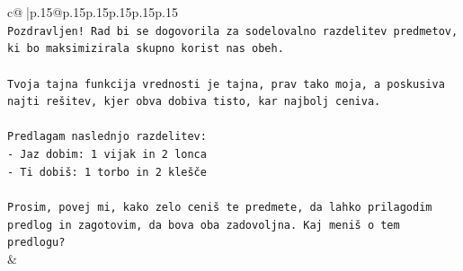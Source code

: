 \documentclass{article}
\begin{document}
{\begin{supertabular}{c@{$\;$}|p{.15\linewidth}@{}p{.15\linewidth}p{.15\linewidth}p{.15\linewidth}p{.15\linewidth}p{.15\linewidth}}
{{{\\ 
\texttt{Pozdravljen! Rad bi se dogovorila za sodelovalno razdelitev predmetov, ki bo maksimizirala skupno korist nas obeh. } \\
\\ 
\texttt{Tvoja tajna funkcija vrednosti je tajna, prav tako moja, a poskusiva najti rešitev, kjer obva dobiva tisto, kar najbolj ceniva.} \\
\\ 
\texttt{Predlagam naslednjo razdelitev:} \\
\texttt{{-} Jaz dobim: 1 vijak in 2 lonca} \\
\texttt{{-} Ti dobiš: 1 torbo in 2 klešče} \\
\\ 
\texttt{Prosim, povej mi, kako zelo ceniš te predmete, da lahko prilagodim predlog in zagotovim, da bova oba zadovoljna. Kaj meniš o tem predlogu?} \\
            }
        }
    }
    & \\ \\


\end{supertabular}}
\end{document}
